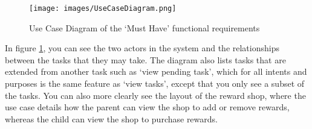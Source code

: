 \begin{figure}[ht]
	\centering
	\texttt{[image: images/UseCaseDiagram.png]}
	\caption{Use Case Diagram of the `Must Have' functional requirements}
	\label{fig:usecasediagram}
\end{figure} 

In figure \ref{fig:usecasediagram}, you can see the two actors in the system and the relationships between the tasks that they may take. 
The diagram also lists tasks that are extended from another task such as `view pending task', which for all intents and purposes is the same feature as `view tasks', except that you only see a subset of the tasks. 
You can also more clearly see the layout of the reward shop, where the use case details how the parent can view the shop to add or remove rewards, whereas the child can view the shop to purchase rewards.